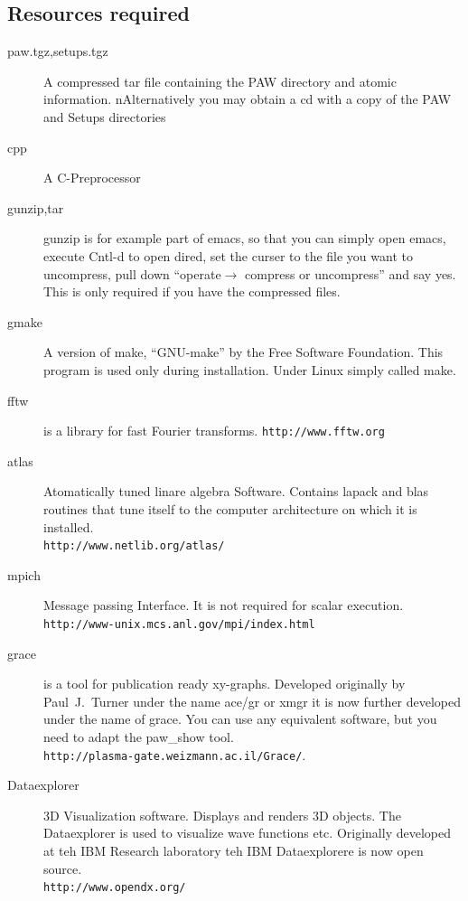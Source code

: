 \documentclass[final,12pt]{article}
\begin{document}
\subsection{Resources required}
\begin{description}
\item[paw.tgz,setups.tgz] A compressed tar file containing the PAW
directory and atomic information. nAlternatively you may obtain a cd
with a copy of the PAW and Setups directories
\item[cpp] A C-Preprocessor
\item[gunzip,tar] gunzip is for example part of emacs, so that you can
simply open emacs, execute Cntl-d to open dired, set the curser to the
file you want to uncompress, pull down ``operate$\rightarrow$ compress
or uncompress'' and say yes. This is only required if you have the
compressed files.
\item[gmake] A version of make, ``GNU-make'' by the Free Software
  Foundation\cite{FreeSoftwareFoundation}. This program is used only
  during installation. Under Linux simply called make.
\item[fftw] is a library for fast Fourier
transforms. \texttt{http://www.fftw.org}
\item[atlas] Atomatically tuned linare algebra Software. Contains
lapack and blas routines that tune itself to the computer architecture
on which it is installed.\\ \texttt{http://www.netlib.org/atlas/}
\item[mpich] Message passing Interface.\cite{MPI}
  It is not required for scalar execution.\\
\texttt{http://www-unix.mcs.anl.gov/mpi/index.html}
\item[grace] is a tool for publication ready xy-graphs. Developed
originally by Paul~J.~Turner \cite{XMGR} under the name ace/gr or xmgr
it is now further developed under the name of grace. You can use any equivalent
  software, but you need to adapt the paw\_show tool.\\
\texttt{http://plasma-gate.weizmann.ac.il/Grace/}. 
\item[Dataexplorer] 3D Visualization software. Displays and renders 3D
objects.  The Dataexplorer is used to visualize wave functions
etc.\cite{Dataexplorer} Originally developed at teh IBM Research
laboratory teh IBM Dataexplorere is now open
source.\\ \texttt{http://www.opendx.org/}
\end{description}
\end{document}
